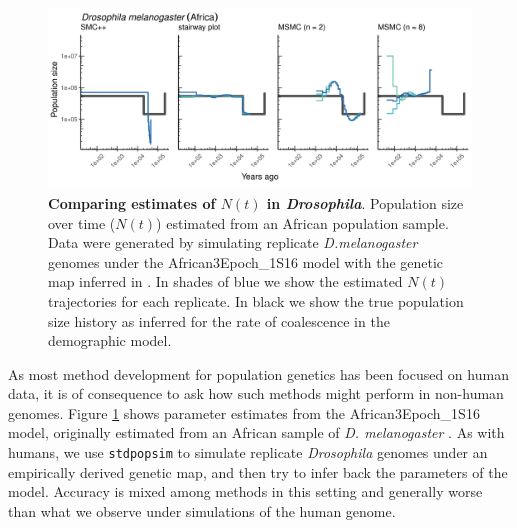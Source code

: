 \documentclass[12pt,halfline,a4paper]{ouparticle}
\newcommand{\stdpopsim}{\texttt{stdpopsim}\xspace}
\begin{document}
\begin{figure}
\begin{center}
\includegraphics[width=0.8\linewidth]{display_items/d_mel_Sheehan_mask2.png}
\caption{\textbf{Comparing estimates of $N(t)$ in \emph{Drosophila}}. Population
size over time ($N(t)$) estimated from an African population sample. Data were generated by simulating
replicate \emph{D.melanogaster} genomes under the African3Epoch\_1S16 model
with the genetic map inferred in \cite{comeron2012many}. In shades of blue we show the estimated
$N(t)$ trajectories for each replicate. In black we show the true population size history as inferred
for the rate of coalescence in the demographic model.}
\label{fig:n_t_sheehan}
\end{center}
\end{figure}

As most method development for population genetics has been focused on human
data, it is of consequence to ask how such methods might perform in non-human
genomes. Figure \ref{fig:n_t_sheehan} shows parameter estimates from the African3Epoch\_1S16
model, originally estimated from an African sample of \emph{D. melanogaster} \citep{sheehan2016deep}.
As with humans, we use \stdpopsim to simulate replicate \emph{Drosophila} genomes under
an empirically derived genetic map, and then try to infer back the parameters of the model.
Accuracy is mixed among methods in this setting and generally worse than what we
observe under simulations of the human genome.
\end{document}
